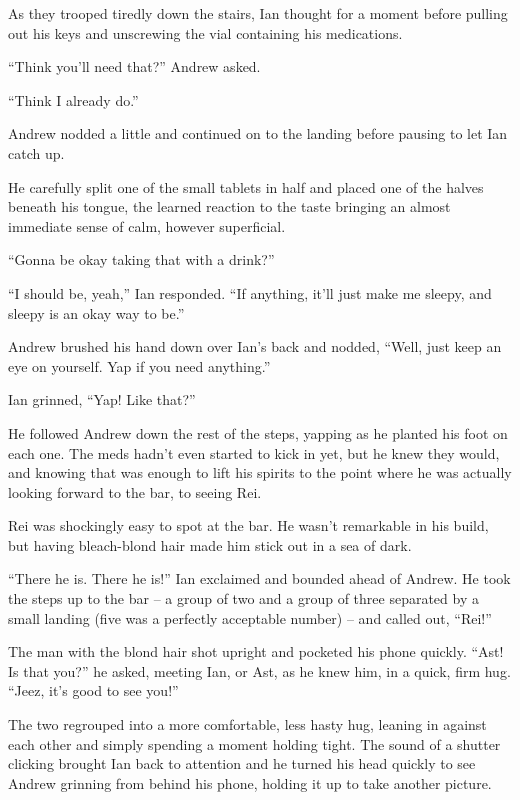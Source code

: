 \documentclass[12pt,letterpaper,oneside]{memoir}
\begin{document}
  As they trooped tiredly down the stairs, Ian thought for a moment before pulling out his keys and unscrewing the vial containing his medications.

  ``Think you'll need that?'' Andrew asked.

  ``Think I already do.''

  Andrew nodded a little and continued on to the landing before pausing to let Ian catch up.

  He carefully split one of the small tablets in half and placed one of the halves beneath his tongue, the learned reaction to the taste bringing an almost immediate sense of calm, however superficial.

  ``Gonna be okay taking that with a drink?''

  ``I should be, yeah,'' Ian responded. ``If anything, it'll just make me sleepy, and sleepy is an okay way to be.''

  Andrew brushed his hand down over Ian's back and nodded, ``Well, just keep an eye on yourself. Yap if you need anything.''

  Ian grinned, ``Yap! Like that?''

  He followed Andrew down the rest of the steps, yapping as he planted his foot on each one. The meds hadn't even started to kick in yet, but he knew they would, and knowing that was enough to lift his spirits to the point where he was actually looking forward to the bar, to seeing Rei.

  Rei was shockingly easy to spot at the bar. He wasn't remarkable in his build, but having bleach-blond hair made him stick out in a sea of dark.

  ``There he is. There he is!'' Ian exclaimed and bounded ahead of Andrew. He took the steps up to the bar -- a group of two and a group of three separated by a small landing (five was a perfectly acceptable number) -- and called out, ``Rei!''

  The man with the blond hair shot upright and pocketed his phone quickly. ``Ast! Is that you?'' he asked, meeting Ian, or Ast, as he knew him, in a quick, firm hug. ``Jeez, it's good to see you!''

  The two regrouped into a more comfortable, less hasty hug, leaning in against each other and simply spending a moment holding tight. The sound of a shutter clicking brought Ian back to attention and he turned his head quickly to see Andrew grinning from behind his phone, holding it up to take another picture.
\end{document}
